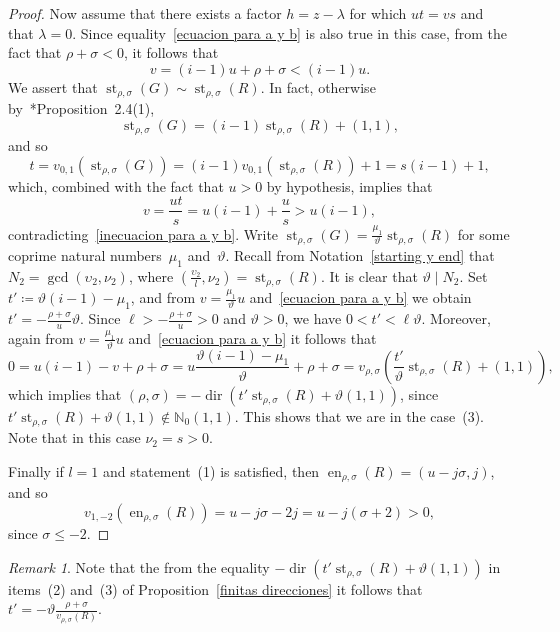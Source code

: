 \documentclass[reqno,a4paper]{amsart}
\theoremstyle{definition}
\theoremstyle{remark}
\newtheorem{remark}[theorem]{Remark}
\DeclareMathOperator{\en}{en}
\DeclareMathOperator{\st}{st}
\DeclareMathOperator{\dir}{dir}
\begin{document}
\begin{proof}
Now assume that there exists a factor $h=z-\lambda$ for which $ut=vs$ and that $\lambda=0$. Since equality~\eqref{ecuacion para a y b} is also true in this case, from the fact that $\rho+\sigma < 0$, it follows that
\begin{equation}\label{inecuacion para a y b}
v=(i-1)u+\rho+\sigma < (i-1)u.
\end{equation}
We assert that $\st_{\rho,\sigma}(G)\sim\st_{\rho,\sigma}(R)$. In fact, otherwise by~\cite{GGV}*{Proposition~2.4(1)},
$$
\st_{\rho,\sigma}(G)= (i-1)\st_{\rho,\sigma}(R)+(1,1),
$$
and so
$$
t=v_{0,1}(\st_{\rho,\sigma}(G))=(i-1)v_{0,1}(\st_{\rho,\sigma}(R))+1=s(i-1)+1,
$$
which, combined with the fact that $u>0$ by hypothesis, implies that
$$
v = \frac{ut}{s} = u(i-1)+\frac{u}{s}>u(i-1),
$$
contradicting~\eqref{inecuacion para a y b}. Write $\st_{\rho,\sigma}(G)=\frac{\mu_1}{\vartheta}\st_{\rho,\sigma}(R)$ for some coprime natural numbers~$\mu_1$ and~$\vartheta$. Recall from Notation~\ref{starting y end} that $N_2=\gcd(\upsilon_2,\nu_2)$, where $\left(\frac{\upsilon_2}{l},\nu_2\right) =\st_{\rho,\sigma}(R)$. It is clear that $\vartheta\mid N_2$. Set $t'\coloneqq \vartheta(i-1)-\mu_1$, and from $v=\frac{\mu_1}{\vartheta}u$ and~\eqref{ecuacion para a y b} we obtain
 $t'=-\frac{\rho+\sigma}{u}\vartheta$. Since $\ell>-\frac{\rho+\sigma}{u}>0$ and $\vartheta>0$, we have $0<t'<\ell \vartheta$. Moreover, again from $v=\frac{\mu_1}{\vartheta}u$ and~\eqref{ecuacion para a y b} it follows that
$$
0 = u(i-1) - v + \rho + \sigma = u\frac{\vartheta(i-1)-\mu_1}{\vartheta}+\rho + \sigma = v_{\rho,\sigma} \left(\frac{t'}{\vartheta} \st_{\rho,\sigma}(R) + (1,1)\right),
$$
which implies that $(\rho,\sigma) = -\dir\left(t'\st_{\rho,\sigma}(R) + \vartheta (1,1)\right)$, since $t' \st_{\rho,\sigma}(R) + \vartheta (1,1)\notin\mathds{N}_0(1,1)$. This shows that we are in the case~(3). Note that in this case $\nu_2=s>0$.

Finally if $l=1$ and statement~(1) is satisfied, then $\en_{\rho,\sigma}(R) = (u - j\sigma,j)$, and so
$$
v_{1,-2}(\en_{\rho,\sigma}(R))= u - j\sigma - 2j = u - j(\sigma + 2)>0,
$$
since $\sigma\le -2$.
\end{proof}

\begin{remark} Note that the from the equality $-\dir\left(t'\st_{\rho,\sigma}(R)+\vartheta (1,1)\right)$ in items~(2) and~(3) of Proposition~\ref{finitas direcciones} it follows that $t'= -\vartheta\frac{\rho+\sigma}{v_{\rho,\sigma}(R)}$.
\end{remark}
\end{document}
